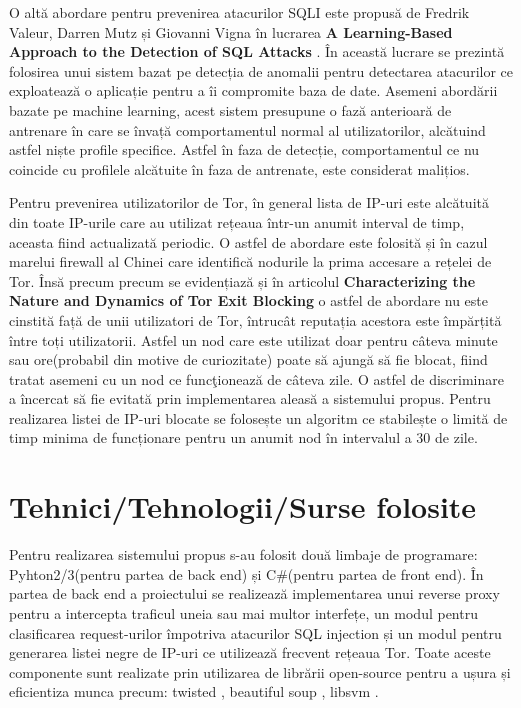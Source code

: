  O altă abordare pentru prevenirea atacurilor SQLI este propusă de Fredrik Valeur, Darren Mutz și Giovanni Vigna în lucrarea \textbf{A Learning-Based Approach to the Detection of SQL Attacks} \cite{sqli_how2}. În această lucrare se prezintă folosirea unui sistem bazat pe detecția de anomalii pentru detectarea atacurilor ce exploatează o aplicație pentru a îi compromite baza de date. Asemeni abordării bazate pe machine learning, acest sistem presupune o fază anterioară de antrenare în care se învață comportamentul normal al utilizatorilor, alcătuind astfel niște profile specifice. Astfel în faza de detecție, comportamentul ce nu coincide cu profilele alcătuite în faza de antrenate, este considerat malițios. 

Pentru prevenirea utilizatorilor de Tor, în general lista de IP-uri este alcătuită din toate IP-urile care au utilizat rețeaua într-un anumit interval de timp, aceasta fiind actualizată periodic. O astfel de abordare este folosită și în cazul marelui firewall al Chinei  \cite{china_tor}  care identifică nodurile la prima accesare a rețelei de Tor. Însă precum precum se evidențiază și în articolul  \textbf{Characterizing the Nature and Dynamics of Tor Exit Blocking} \cite{tor_1} o astfel de abordare nu este cinstită față de unii utilizatori de Tor, întrucât reputația acestora este împărțită între toți utilizatorii. Astfel un nod care este utilizat doar pentru câteva minute sau ore(probabil din motive de curiozitate) poate să ajungă să fie blocat, fiind tratat asemeni cu un nod ce funcţionează de câteva zile. O astfel de discriminare a încercat să fie evitată prin implementarea aleasă a sistemului propus. Pentru realizarea listei de IP-uri blocate se folosește un algoritm ce stabilește o limită de timp minima de funcționare pentru un anumit nod în intervalul a 30 de zile. 


 \section{Tehnici/Tehnologii/Surse folosite}

Pentru realizarea sistemului propus s-au folosit două limbaje de programare: Pyhton2/3(pentru partea de back end) și C\#(pentru partea de front end). În partea de back end a proiectului se realizează implementarea unui reverse proxy pentru a intercepta traficul uneia sau mai multor interfețe, un modul pentru clasificarea request-urilor împotriva atacurilor SQL injection și un modul pentru generarea listei negre de IP-uri ce utilizează frecvent rețeaua Tor. Toate aceste componente sunt realizate prin utilizarea de librării open-source pentru a ușura și eficientiza munca precum:  twisted \cite{twisted}, beautiful soup \cite{btf_soup}, libsvm \cite{libsvm}.

